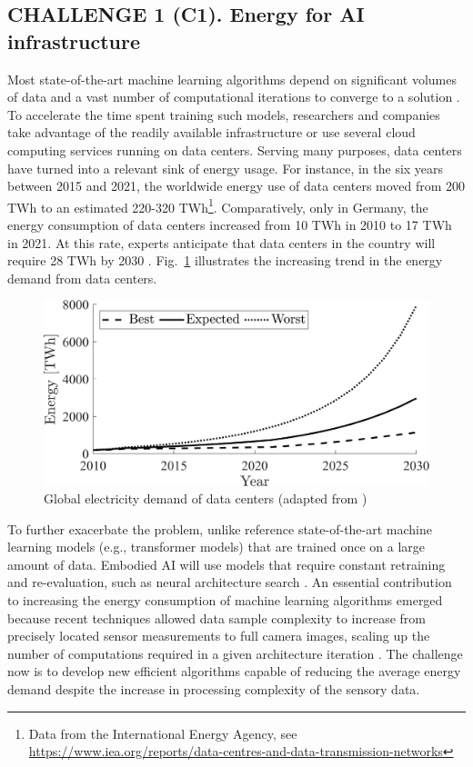 \subsection{\textbf{CHALLENGE 1} (C1). Energy for AI infrastructure}
Most state-of-the-art machine learning algorithms depend on significant volumes of data and a vast number of computational iterations to converge to a solution \cite{Strubell2019EnergyAP}. To accelerate the time spent training such models, researchers and companies take advantage of the readily available infrastructure or use several cloud computing services running on data centers. Serving many purposes, data centers have turned into a relevant sink of energy usage. For instance, in the six years between 2015 and 2021, the worldwide energy use of data centers moved from 200 TWh to an estimated 220-320 TWh\footnote{Data from the International Energy Agency, see \url{https://www.iea.org/reports/data-centres-and-data-transmission-networks}}. Comparatively, only in Germany, the energy consumption of data centers increased from 10 TWh in 2010 to 17 TWh in 2021. At this rate, experts anticipate that data centers in the country will require 28 TWh by 2030 \cite{Hintemann2022Cloudcomputingdrives}. Fig.~\ref{fig:dataCenterEnergy} illustrates the increasing trend in the energy demand from data centers.
\begin{figure}[!t]
	\centering
	\includegraphics[width=0.95\columnwidth]{fig/data_center_energy_consumption.png}
	\caption{Global electricity demand of data centers (adapted from \cite{andrae2015global})}
	\label{fig:dataCenterEnergy}
\end{figure}
To further exacerbate the problem, unlike reference state-of-the-art machine learning models (e.g., transformer models) that are trained once on a large amount of data. Embodied AI will use models that require constant retraining and re-evaluation, such as neural architecture search \cite{real2019regularized}. An essential contribution to increasing the energy consumption of machine learning algorithms emerged because recent techniques allowed data sample complexity to increase from precisely located sensor measurements to full camera images, scaling up the number of computations required in a given architecture iteration \cite{krizhevsky2012imagenet}. The challenge now is to develop new efficient algorithms capable of reducing the average energy demand despite the increase in processing complexity of the sensory data.

